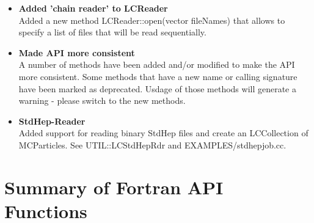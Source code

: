 \documentclass[twoside]{article}
\begin{document}
\begin{itemize}
\item{{\bf Added 'chain reader' to LCReader} \\
Added a new method LCReader::open(vector fileNames) that allows to specify a list of files that
will be read sequentially. \\
}
\item{{\bf Made API more consistent} \\
A number of methods have been added and/or modified to make the API more consistent. Some methods
that have a new name or calling signature have been marked as deprecated. Usdage of those methods will
generate a warning - please switch to the new methods. 
}
\item{{\bf StdHep-Reader}\\
Added support for reading binary StdHep files and create an LCCollection of MCParticles.
See UTIL::LCStdHepRdr and EXAMPLES/stdhepjob.cc.
}

\end{itemize}

\clearpage


\section{Summary of Fortran API Functions} \label{ftn_summary}


\end{document}
